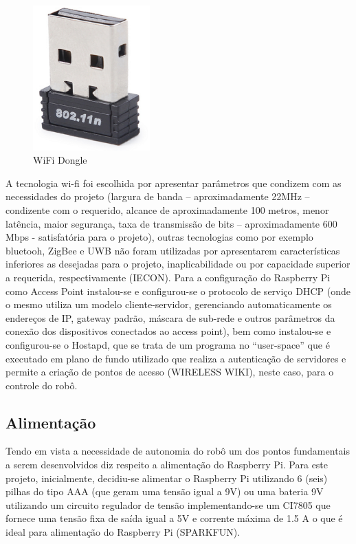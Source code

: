 \begin{figure}[H]
    \centering
    \includegraphics[width=0.4\textwidth]{figuras/adaptador_wifi.eps}
    \caption{ WiFi Dongle}
    \label{fig:catia01}
\end{figure}

A tecnologia wi-fi foi escolhida por apresentar parâmetros que condizem com as necessidades do projeto (largura de banda – aproximadamente
22MHz – condizente com o requerido, alcance de aproximadamente 100 metros, menor latência, maior segurança, taxa de transmissão de bits –
aproximadamente 600 Mbps - satisfatória para o projeto), outras tecnologias como por exemplo bluetooh, ZigBee e UWB não foram utilizadas
por apresentarem características inferiores as desejadas para o projeto, inaplicabilidade ou por capacidade superior a requerida,
respectivamente (IECON). Para a configuração do Raspberry Pi como Access Point instalou-se e configurou-se o protocolo de serviço DHCP
(onde o mesmo utiliza um modelo cliente-servidor, gerenciando automaticamente os endereços de IP, gateway padrão, máscara de sub-rede e
outros parâmetros da conexão dos dispositivos conectados ao access point), bem como instalou-se e configurou-se o Hostapd, que se trata
de um programa no “user-space” que é executado em plano de fundo utilizado que realiza a autenticação de servidores e permite a criação
de pontos de acesso (WIRELESS WIKI), neste caso, para o controle do robô. 

\subsection{Alimentação}

Tendo em vista a necessidade de autonomia do robô um dos pontos fundamentais a serem desenvolvidos diz respeito a alimentação do
Raspberry Pi. Para este projeto, inicialmente, decidiu-se alimentar o Raspberry Pi utilizando 6 (seis) pilhas do tipo AAA (que geram
uma tensão igual a 9V) ou uma bateria 9V utilizando um circuito regulador de tensão implementando-se um CI7805 que fornece uma tensão
fixa de saída igual a 5V e corrente máxima de 1.5 A o que é ideal para alimentação do Raspberry Pi (SPARKFUN).

